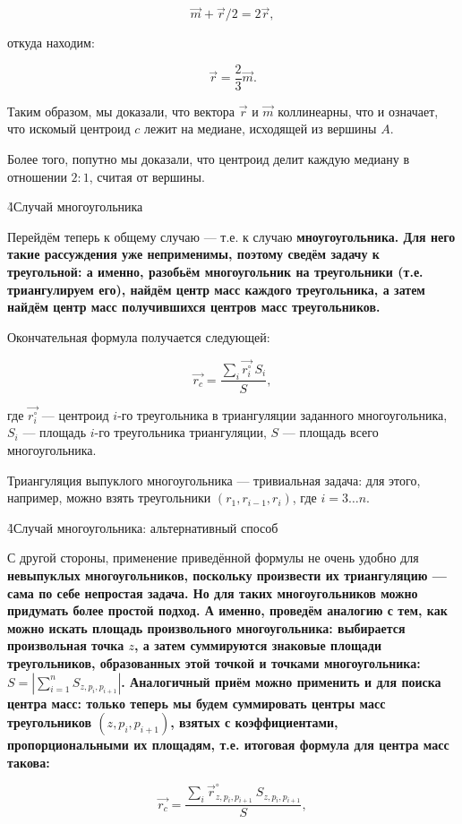$$ \vec{m} + \vec{r}/2 = 2 \vec{r}, $$

откуда находим:

$$ \vec{r} = \frac{2}{3} \vec{m}. $$

Таким образом, мы доказали, что вектора $\vec{r}$ и $\vec{m}$ коллинеарны, что и означает, что искомый центроид $c$ лежит на медиане, исходящей из вершины $A$.

Более того, попутно мы доказали, что центроид делит каждую медиану в отношении $2:1$, считая от вершины.



\h4{Случай многоугольника}

Перейдём теперь к общему случаю --- т.е. к случаю \bf{мноугоугольника}. Для него такие рассуждения уже неприменимы, поэтому сведём задачу к треугольной: а именно, разобьём многоугольник на треугольники (т.е. триангулируем его), найдём центр масс каждого треугольника, а затем найдём центр масс получившихся центров масс треугольников.

Окончательная формула получается следующей:

$$ \vec{r_c} = \frac{ \sum\limits_i \vec{r_i^\circ} ~ S_i }{ S }, $$

где $\vec{r_i^\circ}$ --- центроид $i$-го треугольника в триангуляции заданного многоугольника, $S_i$ --- площадь $i$-го треугольника триангуляции, $S$ --- площадь всего многоугольника.

Триангуляция выпуклого многоугольника --- тривиальная задача: для этого, например, можно взять треугольники $(r_1,r_{i-1},r_i)$, где $i = 3 \ldots n$.

\h4{Случай многоугольника: альтернативный способ}

С другой стороны, применение приведённой формулы не очень удобно для \bf{невыпуклых многоугольников}, поскольку произвести их триангуляцию --- сама по себе непростая задача. Но для таких многоугольников можно придумать более простой подход. А именно, проведём аналогию с тем, как можно искать площадь произвольного многоугольника: выбирается произвольная точка $z$, а затем суммируются знаковые площади треугольников, образованных этой точкой и точками многоугольника: $S = |\sum_{i=1}^n S_{z,p_i,p_{i+1}}|$. Аналогичный приём можно применить и для поиска центра масс: только теперь мы будем суммировать центры масс треугольников $(z,p_i,p_{i+1})$, взятых с коэффициентами, пропорциональными их площадям, т.е. итоговая формула для центра масс такова:

$$ \vec{r_c} = \frac{ \sum\limits_i {\vec r}_{z,p_i,p_{i+1}}^\circ ~ S_{z,p_i,p_{i+1}} }{ S }, $$


